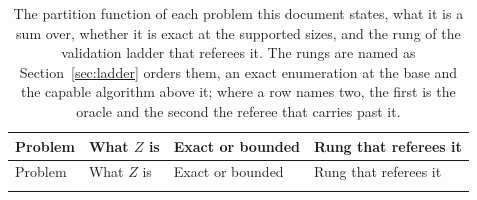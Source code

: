 \documentclass[11pt,a4paper]{article}
\begin{document}
\begin{longtable}{@{}p{}p{}p{}p{}@{}}
  \caption{The partition function of each problem this document states, what it
  is a sum over, whether it is exact at the supported sizes, and the rung of
  the validation ladder that referees it. The rungs are named as
  Section~\ref{sec:ladder} orders them, an exact enumeration at the base and
  the capable algorithm above it; where a row names two, the first is the
  oracle and the second the referee that carries past
  it.}\label{tab:partition-functions}\\
  \toprule
  Problem & What $Z$ is & Exact or bounded & Rung that referees it \\
  \midrule
  \endfirsthead
  \toprule
  Problem & What $Z$ is & Exact or bounded & Rung that referees it \\
  \midrule
  \endhead
  \bottomrule
  \endfoot


\end{longtable}
\end{document}
